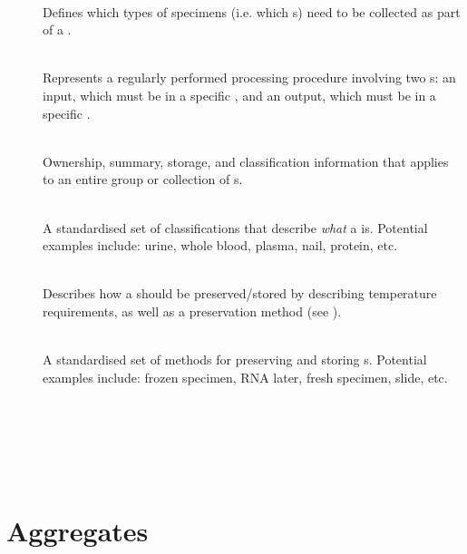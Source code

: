 \begin{description}

  \item[] \hfill \\ Defines
    which types of specimens (i.e. which s) need to
    be collected as part of a .

  \item[] \hfill \\ Represents a regularly
    performed processing procedure involving two s: an
    input, which must be in a specific , and an
    output, which must be in a specific .

  \item[] \hfill \\ Ownership, summary, storage,
    and classification information that applies to an entire group or
    collection of s.

  \item[] \hfill \\ A standardised set of
    classifications that describe \emph{what} a 
    is. Potential examples include: urine, whole blood, plasma, nail, protein,
    etc.

  \item[] \hfill \\ Describes how a
     should be preserved/stored by describing temperature
    requirements, as well as a preservation method (see
    ).

  \item[] \hfill \\ A standardised set of
    methods for preserving and storing s.  Potential
    examples include: frozen specimen, RNA later, fresh specimen, slide, etc.

  \item[\valobjtarget{}] \hfill \\

  \item[\valobjtarget{}] \hfill \\

  \item[\valobjtarget{}] \hfill \\

\end{description}

\section{Aggregates}
